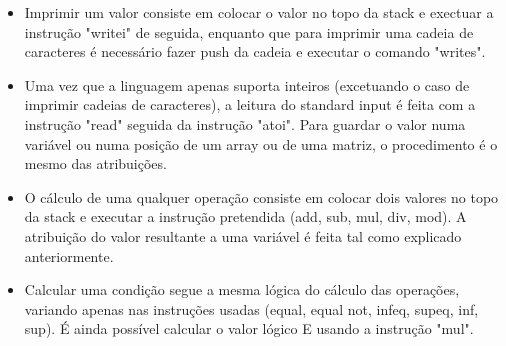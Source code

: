 \documentclass{report}
\begin{document}
\begin{itemize}
\begin{multicols}{2}
\begin{itemize}
\item \textbf{ARRAY}
\item pushgp
\item pushi P
\item padd
\item pushi I
\item loadn
\end{itemize}
\columnbreak
\begin{itemize}
\item \textbf{MATRIZ}
\item pushgp
\item pushi P
\item padd
\item pushi I
\item push T
\item mul
\item push J
\item loadn
\end{itemize}
\end{multicols}
\item Imprimir um valor consiste em colocar o valor no topo da stack e exectuar a instrução "writei" de seguida, enquanto que para imprimir uma cadeia de caracteres é necessário fazer push da cadeia e executar o comando "writes".
\item Uma vez que a linguagem apenas suporta inteiros (excetuando o caso de imprimir cadeias de caracteres), a leitura do standard input é feita com a instrução "read" seguida da instrução "atoi". Para guardar o valor numa variável ou numa posição de um array ou de uma matriz, o procedimento é o mesmo das atribuições.
\item O cálculo de uma qualquer operação consiste em colocar dois valores no topo da stack e executar a instrução pretendida (add, sub, mul, div, mod). A atribuição do valor resultante a uma variável é feita tal como explicado anteriormente.
\item Calcular uma condição segue a mesma lógica do cálculo das operações, variando apenas nas instruções usadas (equal, equal not, infeq, supeq, inf, sup). É ainda possível calcular o valor lógico E usando a instrução "mul".
\end{itemize}
\end{document}
